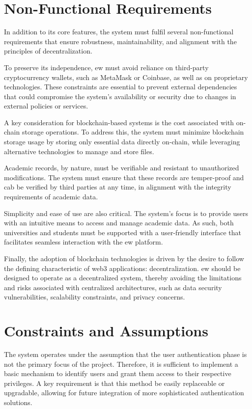 \section{Non-Functional Requirements}
In addition to its core features, the system must fulfil several non-functional requirements that ensure robustness, maintainability, and alignment with the principles of decentralization. 

To preserve its independence, \acrshort{ew} must avoid reliance on third-party cryptocurrency wallets, such as MetaMask or Coinbase, as well as on proprietary technologies. These constraints are essential to prevent external dependencies that could compromise the system’s availability or security due to changes in external policies or services.

A key consideration for blockchain-based systems is the cost associated with on-chain storage operations. To address this, the system must minimize blockchain storage usage by storing only essential data directly on-chain, while leveraging alternative technologies to manage and store files.

Academic records, by nature, must be verifiable and resistant to unauthorized modifications. The system must ensure that these records are temper-proof and cab be verified by third parties at any time, in alignment with the integrity requirements of academic data.

Simplicity and ease of use are also critical. The system's focus is to provide users with an intuitive means to access and manage academic data. As such, both universities and students must be supported with a user-friendly interface that facilitates seamless interaction with the \acrshort{ew} platform.

Finally, the adoption of blockchain technologies is driven by the desire to follow the defining characteristic of \Gls{web3} applications: decentralization. \acrshort{ew} should be designed to operate as a decentralized system, thereby avoiding the limitations and risks associated with centralized architectures, such as data security vulnerabilities, scalability constraints, and privacy concerns.

\section{Constraints and Assumptions}
The system operates under the assumption that the user authentication phase is not the primary focus of the project. Therefore, it is sufficient to implement a basic mechanism to identify users and grant them access to their respective privileges. A key requirement is that this method be easily replaceable or upgradable, allowing for future integration of more sophisticated authentication solutions.

